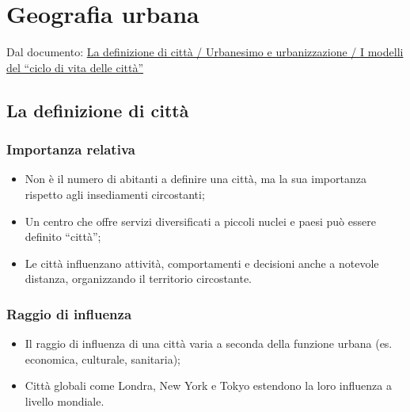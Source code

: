 \documentclass{article}
\begin{document}
\begin{center}
\end{center}

\newpage
\section{Geografia urbana}
Dal documento: \href{https://github.com/matteofrongillo/passerella/blob/main/Geografia/media/053_Materiale OLE_Pass 06e GeografiaUrbana 23-24_Pass_06e_GeografiaUrbana_23-24.pdf?raw=true}
{La definizione di città / Urbanesimo e urbanizzazione / I modelli del ``ciclo di vita delle città''}

\subsection{La definizione di città}
\subsubsection{Importanza relativa}
\begin{itemize}
    \item Non è il numero di abitanti a definire una città, ma la sua importanza rispetto agli
        insediamenti circostanti;
    \item Un centro che offre servizi diversificati a piccoli nuclei e paesi può essere definito
        ``città'';
    \item Le città influenzano attività, comportamenti e decisioni anche a notevole distanza,
        organizzando il territorio circostante.
\end{itemize}

\subsubsection{Raggio di influenza}
\begin{itemize}
    \item Il raggio di influenza di una città varia a seconda della funzione urbana
        (es. economica, culturale, sanitaria);
    \item Città globali come Londra, New York e Tokyo estendono la loro influenza a livello
        mondiale.
\end{itemize}
\end{document}
